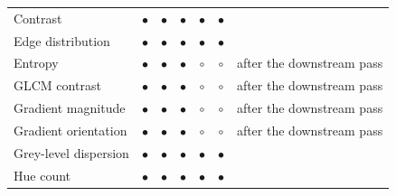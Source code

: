 \begin{table}[!ht]
\begin{tabular}{@{}l ccccc >{\raggedright\arraybackslash}p{3.2cm}@{}}
Contrast & \textcolor{accentgreen!70!black}{\textbf{$\bullet$}} & \textcolor{accentgreen!70!black}{\textbf{$\bullet$}} & \textcolor{accentgreen!70!black}{\textbf{$\bullet$}} & \textcolor{accentgreen!70!black}{\textbf{$\bullet$}} & \textcolor{accentgreen!70!black}{\textbf{$\bullet$}} & \textcolor{black!55}{\scriptsize } \\
\rowcolor{rowlight}Edge distribution & \textcolor{accentgreen!70!black}{\textbf{$\bullet$}} & \textcolor{accentgreen!70!black}{\textbf{$\bullet$}} & \textcolor{accentgreen!70!black}{\textbf{$\bullet$}} & \textcolor{accentgreen!70!black}{\textbf{$\bullet$}} & \textcolor{accentgreen!70!black}{\textbf{$\bullet$}} & \textcolor{black!55}{\scriptsize } \\
Entropy & \textcolor{accentgreen!70!black}{\textbf{$\bullet$}} & \textcolor{accentgreen!70!black}{\textbf{$\bullet$}} & \textcolor{accentgreen!70!black}{\textbf{$\bullet$}} & \textcolor{black!28}{$\circ$} & \textcolor{black!28}{$\circ$} & \textcolor{black!55}{\scriptsize after the downstream pass} \\
\rowcolor{rowlight}GLCM contrast & \textcolor{accentgreen!70!black}{\textbf{$\bullet$}} & \textcolor{accentgreen!70!black}{\textbf{$\bullet$}} & \textcolor{accentgreen!70!black}{\textbf{$\bullet$}} & \textcolor{black!28}{$\circ$} & \textcolor{black!28}{$\circ$} & \textcolor{black!55}{\scriptsize after the downstream pass} \\
Gradient magnitude & \textcolor{accentgreen!70!black}{\textbf{$\bullet$}} & \textcolor{accentgreen!70!black}{\textbf{$\bullet$}} & \textcolor{accentgreen!70!black}{\textbf{$\bullet$}} & \textcolor{black!28}{$\circ$} & \textcolor{black!28}{$\circ$} & \textcolor{black!55}{\scriptsize after the downstream pass} \\
\rowcolor{rowlight}Gradient orientation & \textcolor{accentgreen!70!black}{\textbf{$\bullet$}} & \textcolor{accentgreen!70!black}{\textbf{$\bullet$}} & \textcolor{accentgreen!70!black}{\textbf{$\bullet$}} & \textcolor{black!28}{$\circ$} & \textcolor{black!28}{$\circ$} & \textcolor{black!55}{\scriptsize after the downstream pass} \\
Grey-level dispersion & \textcolor{accentgreen!70!black}{\textbf{$\bullet$}} & \textcolor{accentgreen!70!black}{\textbf{$\bullet$}} & \textcolor{accentgreen!70!black}{\textbf{$\bullet$}} & \textcolor{accentgreen!70!black}{\textbf{$\bullet$}} & \textcolor{accentgreen!70!black}{\textbf{$\bullet$}} & \textcolor{black!55}{\scriptsize } \\
\rowcolor{rowlight}Hue count & \textcolor{accentgreen!70!black}{\textbf{$\bullet$}} & \textcolor{accentgreen!70!black}{\textbf{$\bullet$}} & \textcolor{accentgreen!70!black}{\textbf{$\bullet$}} & \textcolor{accentgreen!70!black}{\textbf{$\bullet$}} & \textcolor{accentgreen!70!black}{\textbf{$\bullet$}} & \textcolor{black!55}{\scriptsize } \\

\end{tabular}
\end{table}

